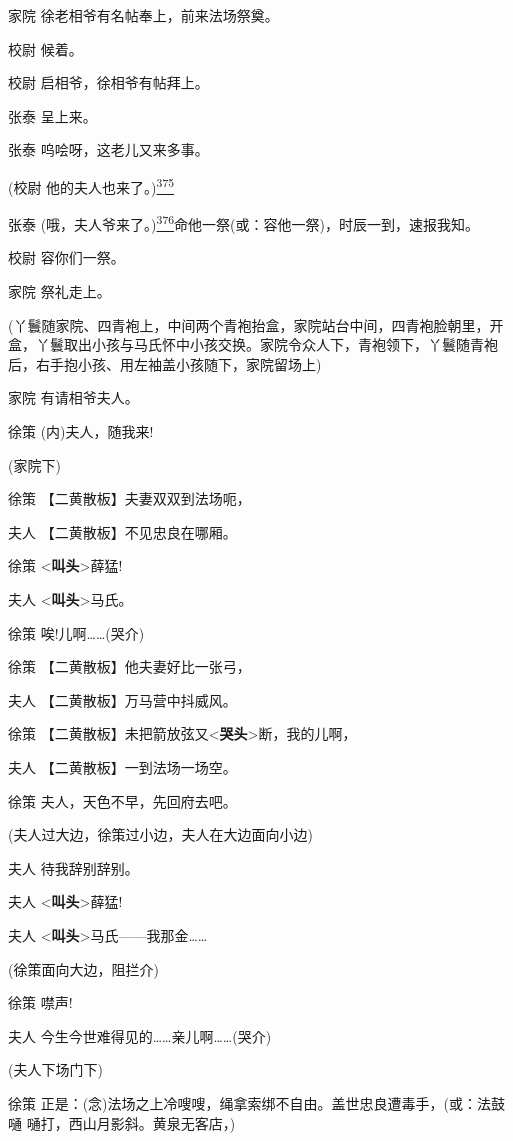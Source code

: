 家院 徐老相爷有名帖奉上，前来法场祭奠。

校尉 候着。

校尉 启相爷，徐相爷有帖拜上。

张泰 呈上来。

张泰 呜哙呀，这老儿又来多事。

(校尉 他的夫人也来了。)\protect\hyperlink{fn375}{\textsuperscript{375}}

张泰
(哦，夫人爷来了。)\protect\hyperlink{fn376}{\textsuperscript{376}}命他一祭(或：容他一祭)，时辰一到，速报我知。

校尉 容你们一祭。

家院 祭礼走上。

(丫鬟随家院、四青袍上，中间两个青袍抬盒，家院站台中间，四青袍脸朝里，开盒，丫鬟取出小孩与马氏怀中小孩交换。家院令众人下，青袍领下，丫鬟随青袍后，右手抱小孩、用左袖盖小孩随下，家院留场上)

家院 有请相爷夫人。

徐策 (内)夫人，随我来!

(家院下)

徐策 【二黄散板】夫妻双双到法场呃，

夫人 【二黄散板】不见忠良在哪厢。

徐策 \textless{}\textbf{叫头}\textgreater{}薛猛!

夫人 \textless{}\textbf{叫头}\textgreater{}马氏。

徐策 唉!儿啊\ldots{}\ldots{}(哭介)

徐策 【二黄散板】他夫妻好比一张弓，

夫人 【二黄散板】万马营中抖威风。

徐策
【二黄散板】未把箭放弦又\textless{}\textbf{哭头}\textgreater{}断，我的儿啊，

夫人 【二黄散板】一到法场一场空。

徐策 夫人，天色不早，先回府去吧。

(夫人过大边，徐策过小边，夫人在大边面向小边)

夫人 待我辞别辞别。

夫人 \textless{}\textbf{叫头}\textgreater{}薛猛!

夫人
\textless{}\textbf{叫头}\textgreater{}马氏------我那金\ldots{}\ldots{}

(徐策面向大边，阻拦介)

徐策 噤声!

夫人 今生今世难得见的\ldots{}\ldots{}亲儿啊\ldots{}\ldots{}(哭介)

(夫人下场门下)

徐策
正是：(念)法场之上冷嗖嗖，绳拿索绑不自由。盖世忠良遭毒手，(或：法鼓嗵
嗵打，西山月影斜。黄泉无客店，)

